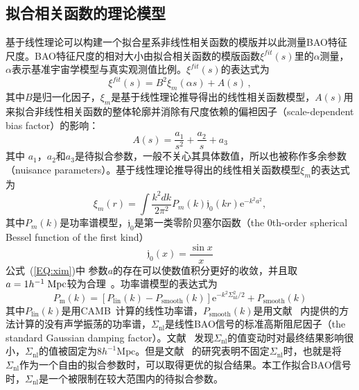 \subsection{拟合相关函数的理论模型}
基于线性理论可以构建一个拟合星系非线性相关函数的模版并以此测量BAO特征尺度。BAO特征尺度的相对大小由拟合相关函数的模版函数$\xi^{fit}(s)$里的$\alpha$测量，$\alpha$表示基准宇宙学模型与真实观测值比例。$\xi^{fit}(s)$的表达式为
\begin{equation} \label{EQ:xifit}
\xi^{fit}(s) = B^{2} \xi_{m}(\alpha s) + A(s)\,,
\end{equation}
其中$B$是归一化因子，$\xi_{m}$是基于线性理论推导得出的线性相关函数模型，$A(s)$用来拟合非线性相关函数的整体轮廓并消除有尺度依赖的偏袒因子（scale-dependent bias factor）的影响：
\begin{equation}
A(s)  = \frac{a_1}{s^2} + \frac{a_2}{s} + a_3
\end{equation}
其中 $a_1$，$a_2$和$a_3$是待拟合参数，一般不关心其具体数值，所以也被称作多余参数（nuisance parameters）。基于线性理论推导得出的线性相关函数模型$\xi_{m}$的表达式为
\begin{equation} \label{EQ:xim}
\xi_m(r) = \int \frac{k^2dk}{2\pi^2}P_m(k) \mathfrak{j}_0 (kr)\mathrm{e}^{-k^2a^2},
\end{equation}
其中$P_m(k)$是功率谱模型，$\mathfrak{j}_0$是第一类零阶贝塞尔函数（the 0th-order spherical Bessel function of the first kind）
\begin{equation}
\mathfrak{j}_0 (x) =  \frac{\sin{x}}{x}
\end{equation}
公式~(\ref{EQ:xim})中
参数$a$的存在可以使数值积分更好的收敛，并且取$a = 1 h^{-1}{\rm\;Mpc}$较为合理~\cite{Xu2012}。功率谱模型的表达式为
\begin{equation}
P_{\mathrm{m}} (k) = [P_{\mathrm{lin}} (k) - P_{\mathrm{smooth}} (k)] \mathrm{e}^{-k^2 \Sigma^2_{\mathrm{nl}} / 2} + P_{\mathrm{smooth}} (k)
\end{equation}
其中$P_{\mathrm{lin}} (k)$是用CAMB~\cite{CAMB2000}计算的线性功率谱，$P_{\mathrm{smooth}} (k)$是用文献 ~内提供的方法计算的没有声学振荡的功率谱，$\Sigma_{\mathrm{nl}}$是线性BAO信号的标准高斯阻尼因子（the standard Gaussian damping factor）。文献 ~发现$\Sigma_{\mathrm{nl}}$的值变动时对最终结果影响很小，$\Sigma_{\mathrm{nl}}$的值被固定为$8 h^{-1}\mathrm{Mpc}$。但是文献 ~的研究表明不固定$\Sigma_{\mathrm{nl}}$时，也就是将$\Sigma_{\mathrm{nl}}$作为一个自由的拟合参数时，可以取得更优的拟合结果。本工作拟合BAO信号时，$\Sigma_{\mathrm{nl}}$是一个被限制在较大范围内的待拟合参数。

